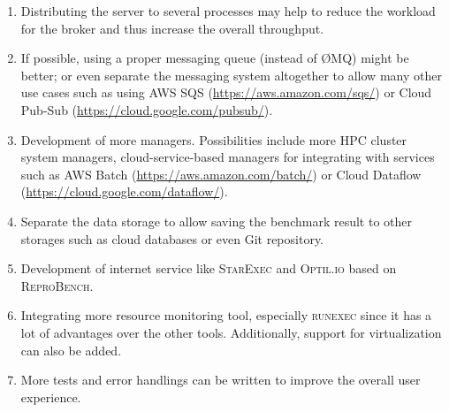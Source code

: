 \begin{enumerate}
    \item Distributing the server to several processes may help to reduce the workload for the broker and thus increase the overall throughput.
    \item If possible, using a proper messaging queue (instead of \O MQ) might be better; or even separate the messaging system altogether to allow many other use cases such as using AWS SQS (\url{https://aws.amazon.com/sqs/}) or Cloud Pub-Sub (\url{https://cloud.google.com/pubsub/}).
    \item Development of more managers. Possibilities include more HPC cluster system managers, cloud-service-based managers for integrating with services such as AWS Batch (\url{https://aws.amazon.com/batch/}) or Cloud Dataflow (\url{https://cloud.google.com/dataflow/}).
    \item Separate the data storage to allow saving the benchmark result to other storages such as cloud databases or even Git repository.
    \item Development of internet service like \textsc{StarExec} and \textsc{Optil.io} based on \textsc{ReproBench}.
    \item Integrating more resource monitoring tool, especially \textsc{runexec} since it has a lot of advantages over the other tools. Additionally, support for virtualization can also be added.
    \item More tests and error handlings can be written to improve the overall user experience.
\end{enumerate}
